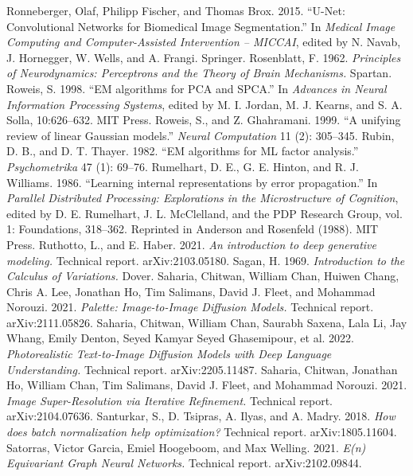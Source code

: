  Ronneberger, Olaf, Philipp Fischer, and Thomas Brox. 2015. ``U-Net: Convolutional Networks for Biomedical Image Segmentation.'' In \emph{Medical Image Computing and Computer-Assisted Intervention -- MICCAI}, edited by N. Navab, J. Hornegger, W. Wells, and A. Frangi. Springer.
 Rosenblatt, F. 1962. \emph{Principles of Neurodynamics: Perceptrons and the Theory of Brain Mechanisms.} Spartan.
 Roweis, S. 1998. ``EM algorithms for PCA and SPCA.'' In \emph{Advances in Neural Information Processing Systems}, edited by M. I. Jordan, M. J. Kearns, and S. A. Solla, 10:626--632. MIT Press.
 Roweis, S., and Z. Ghahramani. 1999. ``A unifying review of linear Gaussian models.'' \emph{Neural Computation} 11 (2): 305--345.
 Rubin, D. B., and D. T. Thayer. 1982. ``EM algorithms for ML factor analysis.'' \emph{Psychometrika} 47 (1): 69--76.
 Rumelhart, D. E., G. E. Hinton, and R. J. Williams. 1986. ``Learning internal representations by error propagation.'' In \emph{Parallel Distributed Processing: Explorations in the Microstructure of Cognition}, edited by D. E. Rumelhart, J. L. McClelland, and the PDP Research Group, vol. 1: Foundations, 318--362. Reprinted in Anderson and Rosenfeld (1988). MIT Press.
 Ruthotto, L., and E. Haber. 2021. \emph{An introduction to deep generative modeling.} Technical report. arXiv:2103.05180.
 Sagan, H. 1969. \emph{Introduction to the Calculus of Variations.} Dover.
 Saharia, Chitwan, William Chan, Huiwen Chang, Chris A. Lee, Jonathan Ho, Tim Salimans, David J. Fleet, and Mohammad Norouzi. 2021. \emph{Palette: Image-to-Image Diffusion Models.} Technical report. arXiv:2111.05826.
 Saharia, Chitwan, William Chan, Saurabh Saxena, Lala Li, Jay Whang, Emily Denton, Seyed Kamyar Seyed Ghasemipour, et al. 2022. \emph{Photorealistic Text-to-Image Diffusion Models with Deep Language Understanding.} Technical report. arXiv:2205.11487.
 Saharia, Chitwan, Jonathan Ho, William Chan, Tim Salimans, David J. Fleet, and Mohammad Norouzi. 2021. \emph{Image Super-Resolution via Iterative Refinement.} Technical report. arXiv:2104.07636.
 Santurkar, S., D. Tsipras, A. Ilyas, and A. Madry. 2018. \emph{How does batch normalization help optimization?} Technical report. arXiv:1805.11604.
 Satorras, Victor Garcia, Emiel Hoogeboom, and Max Welling. 2021. \emph{E(n) Equivariant Graph Neural Networks.} Technical report. arXiv:2102.09844.
